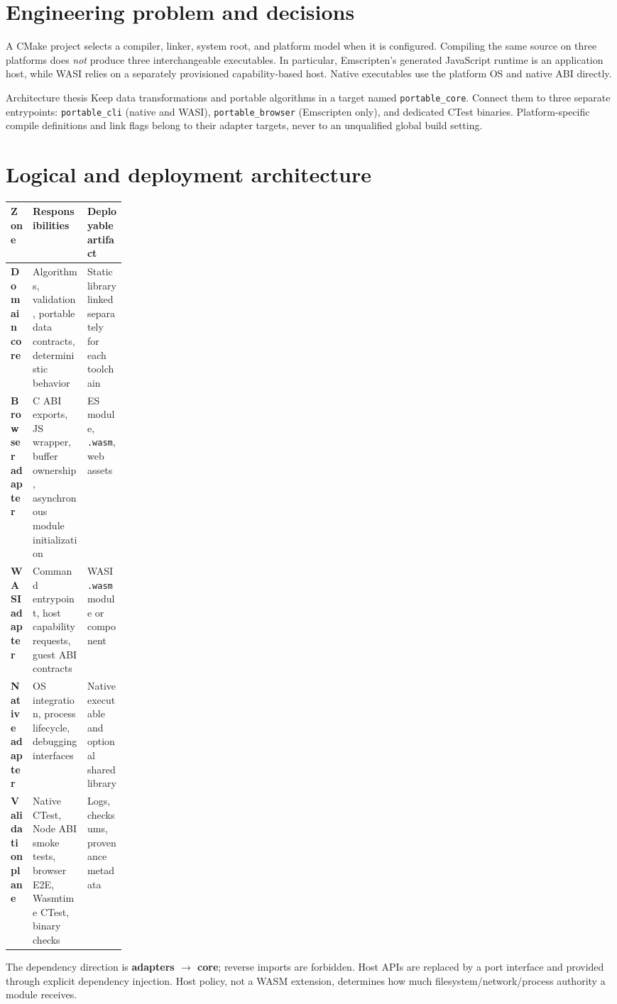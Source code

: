 \documentclass[11pt,letterpaper]{article}
\begin{document}
\frontmatterdoc
\section{Engineering problem and decisions}
A CMake project selects a compiler, linker, system root, and platform model when it is configured. Compiling the same source on three platforms does \emph{not} produce three interchangeable executables. In particular, Emscripten's generated JavaScript runtime is an application host, while WASI relies on a separately provisioned capability-based host. Native executables use the platform OS and native ABI directly.

\begin{principle}{Architecture thesis}
Keep data transformations and portable algorithms in a target named \texttt{portable\_core}. Connect them to three separate entrypoints: \texttt{portable\_cli} (native and WASI), \texttt{portable\_browser} (Emscripten only), and dedicated CTest binaries. Platform-specific compile definitions and link flags belong to their adapter targets, never to an unqualified global build setting.
\end{principle}

\section{Logical and deployment architecture}
\begin{center}\small
\noindent\begin{tabularx}{\linewidth}{>{\bfseries}p{0.19\linewidth}X X}
\toprule
Zone & Responsibilities & Deployable artifact \\
\midrule
Domain core & Algorithms, validation, portable data contracts, deterministic behavior & Static library linked separately for each toolchain \\
Browser adapter & C ABI exports, JS wrapper, buffer ownership, asynchronous module initialization & ES module, \texttt{.wasm}, web assets \\
WASI adapter & Command entrypoint, host capability requests, guest ABI contracts & WASI \texttt{.wasm} module or component \\
Native adapter & OS integration, process lifecycle, debugging interfaces & Native executable and optional shared library \\
Validation plane & Native CTest, Node ABI smoke tests, browser E2E, Wasmtime CTest, binary checks & Logs, checksums, provenance metadata \\
\bottomrule
\end{tabularx}
\end{center}
The dependency direction is \textbf{adapters $\rightarrow$ core}; reverse imports are forbidden. Host APIs are replaced by a port interface and provided through explicit dependency injection. Host policy, not a WASM extension, determines how much filesystem/network/process authority a module receives.
\end{document}
